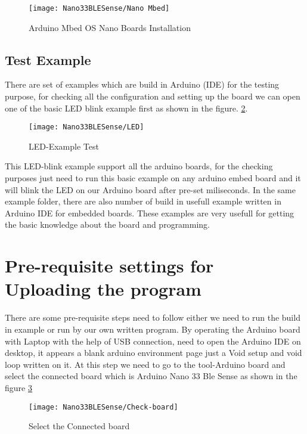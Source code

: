 \begin{figure}[h]
	\centering
	\texttt{[image: Nano33BLESense/Nano Mbed]}
	\caption{Arduino Mbed OS Nano Boards Installation}
	\label{fig:Arduino-Mbed-Boards Installation}
\end{figure}


\subsection{Test Example}

There are set of examples which are build in Arduino (IDE) for the testing purpose, for checking all the configuration and setting up the board we can open one of the basic LED blink example first as shown in the figure.  \ref{fig:LED-Example}.

\begin{figure}[h]
	\centering
	\texttt{[image: Nano33BLESense/LED]}
	\caption{LED-Example Test}
	\label{fig:LED-Example}
\end{figure}

This LED-blink example support all the arduino boards, for the checking purposes just need to run this basic example on any arduino embed board and it will blink the LED on our Arduino board after pre-set miliseconds. In the same example folder, there are also number of build in usefull example written in Arduino IDE for embedded boards. These examples are very usefull for getting the basic knowledge about the board and programming.

\section{Pre-requisite settings for Uploading the program}

There are some pre-requisite steps need to follow either we need to run the build in example or run by our own written program. By operating the Arduino board with Laptop with the help of USB connection, need to open the Arduino IDE on desktop, it appears a blank arduino environment page just a Void setup and void loop written on it. At this step we need to go to the tool-Arduino board and select the connected board which is Arduino Nano 33 Ble Sense as shown in the figure \ref{fig:Check Board}

\begin{figure}[h]
	\centering
	\texttt{[image: Nano33BLESense/Check-board]}
	\caption{Select the Connected board}
	\label{fig:Check Board}
\end{figure}

